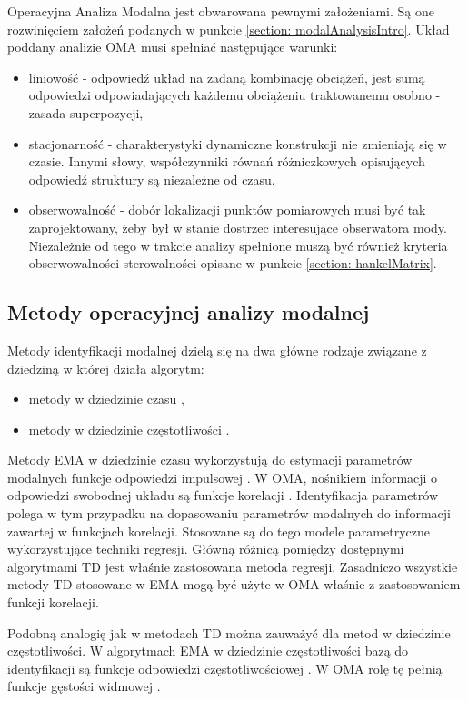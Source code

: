 Operacyjna Analiza Modalna jest obwarowana pewnymi założeniami. Są one rozwinięciem założeń podanych w punkcie \ref{section: modalAnalysisIntro}. Układ poddany analizie OMA musi spełniać następujące warunki:
\begin{itemize}
	\item liniowość - odpowiedź układ na zadaną kombinację obciążeń, jest sumą odpowiedzi odpowiadających każdemu obciążeniu traktowanemu osobno - zasada superpozycji,
	\item stacjonarność - charakterystyki dynamiczne konstrukcji nie zmieniają się w czasie. Innymi słowy, współczynniki równań różniczkowych opisujących odpowiedź struktury są niezależne od czasu.
	\item obserwowalność - dobór lokalizacji punktów pomiarowych musi być tak zaprojektowany, żeby był w stanie dostrzec interesujące obserwatora mody. Niezależnie od tego w trakcie analizy spełnione muszą być również kryteria obserwowalności sterowalności opisane w punkcie \ref{section: hankelMatrix}.
\end{itemize}


\subsection{Metody operacyjnej analizy modalnej}

Metody identyfikacji modalnej dzielą się na dwa główne rodzaje związane z dziedziną w której działa algorytm:
\begin{itemize}[noitemsep]
	\item metody w dziedzinie czasu ,
	\item metody w dziedzinie częstotliwości .
\end{itemize}
Metody EMA w dziedzinie czasu wykorzystują do estymacji parametrów modalnych funkcje odpowiedzi impulsowej . W OMA, nośnikiem informacji o odpowiedzi swobodnej układu  są funkcje korelacji . Identyfikacja parametrów polega w tym przypadku na dopasowaniu parametrów modalnych do informacji zawartej w funkcjach korelacji. Stosowane są do tego modele parametryczne wykorzystujące techniki regresji. Główną różnicą pomiędzy dostępnymi algorytmami TD jest właśnie zastosowana metoda regresji. Zasadniczo wszystkie metody TD stosowane w EMA mogą być użyte w OMA właśnie z zastosowaniem funkcji korelacji. 


Podobną analogię jak w metodach TD można zauważyć dla metod w dziedzinie częstotliwości. W algorytmach EMA w dziedzinie częstotliwości bazą do identyfikacji są funkcje odpowiedzi częstotliwościowej . W OMA rolę tę pełnią funkcje gęstości widmowej .

